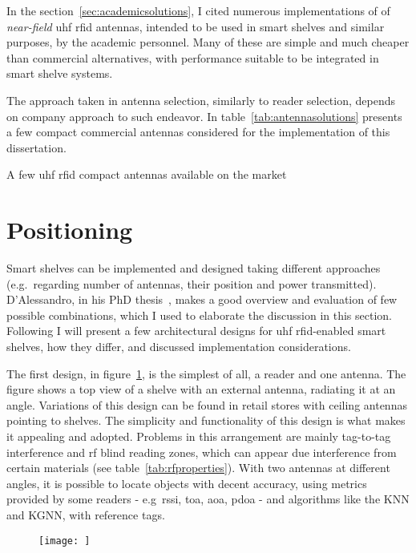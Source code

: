 In the section~\ref{sec:academicsolutions}, I cited numerous implementations of of \emph{near-field} \ac{uhf} \ac{rfid} antennas, intended to be used in smart shelves and similar purposes, by the academic personnel. Many of these are simple and much cheaper than commercial alternatives, with performance suitable to be integrated in smart shelve systems. 

The approach taken in antenna selection, similarly to reader selection, depends on company approach to such endeavor. 
In table~\ref{tab:antennasolutions} presents a few compact commercial antennas considered for the implementation of this dissertation.

\begin{table}
    \centering
    \caption{A few \ac{uhf} \ac{rfid} compact antennas available on the market}
    \label{tab:antennasolutions}
\end{table}

\section{Positioning}

Smart shelves can be implemented and designed taking different approaches (e.g.\ regarding number of antennas, their position and power transmitted).
D’Alessandro, in his PhD thesis~\cite{dalessandroRFIDBasedSmartShelving2012}, makes a good overview and evaluation of few possible combinations, which I used to elaborate the discussion in this section.
Following I will present a few architectural designs for \ac{uhf} \ac{rfid}-enabled smart shelves, how they differ, and discussed implementation considerations.

The first design, in figure~\ref{fig:position1}, is the simplest of all, a reader and one antenna. The figure shows a top view of a shelve with an external antenna, radiating it at an angle. Variations of this design can be found in retail stores with ceiling antennas pointing to shelves.
The simplicity and functionality of this design is what makes it appealing and adopted.
Problems in this arrangement are mainly  tag-to-tag interference and \ac{rf} blind reading zones, which can appear due interference from certain materials (see table~\ref{tab:rfproperties}).
With two antennas at different angles, it is possible to locate objects with decent accuracy, using metrics provided by some readers - e.g\ \ac{rssi}, \ac{toa}, \ac{aoa}, \ac{pdoa} - and algorithms like the KNN and KGNN, with reference tags.

\begin{figure}[!ht]
    \centering
    \texttt{[image: ]}
    \caption{} 
    \label{fig:position1}
\end{figure}

